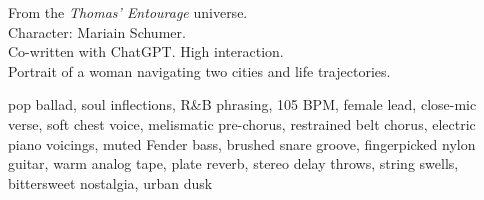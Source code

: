 

\begin{notes}
From the \emph{Thomas’ Entourage} universe.\\
Character: Mariain Schumer.\\
Co-written with ChatGPT. %
High interaction.\\
Portrait of a woman navigating two cities and life trajectories.
\end{notes}

\begin{style}
pop ballad, soul inflections, R\&B phrasing, 105 BPM, female lead, close-mic verse, soft chest voice, melismatic pre-chorus, restrained belt chorus, electric piano voicings, muted Fender bass, brushed snare groove, fingerpicked nylon guitar, warm analog tape, plate reverb, stereo delay throws, string swells, bittersweet nostalgia, urban dusk
\end{style}

